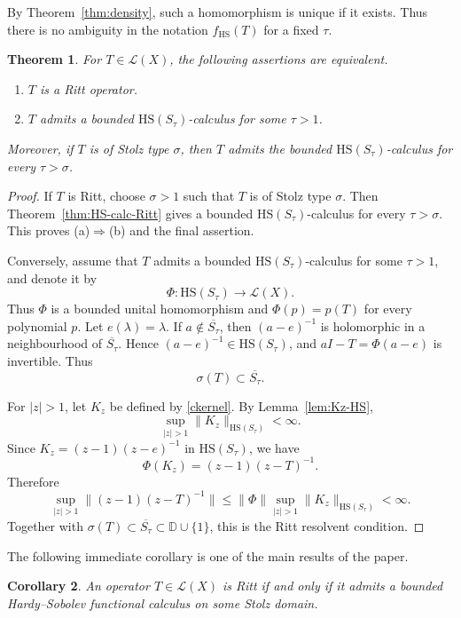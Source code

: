 \documentclass[11pt]{amsart}
\numberwithin{equation}{section}
\newtheorem{theorem}{Theorem}[section]
\newtheorem{corollary}[theorem]{Corollary}
\theoremstyle{definition}
\theoremstyle{plain}
\def\L{L}
\def\D{\mathbb{D}}
\newcommand{\HS}{\mathrm{HS}}
\renewcommand{\L}{\mathcal L}
\begin{document}
By Theorem~\ref{thm:density}, such a homomorphism is unique if it exists. Thus
there is no ambiguity in the notation \(f_{\HS}(T)\) for a fixed \(\tau\).

\begin{theorem}\label{thm:Ritt-iff-HS}
For \(T\in\L(X)\), the following assertions are equivalent.
\begin{enumerate}[label=\textnormal{(\alph*)}]
\item \(T\) is a Ritt operator.
\item \(T\) admits a bounded \(\HS(S_\tau)\)-calculus for some \(\tau>1\).
\end{enumerate}
Moreover, if \(T\) is of Stolz type \(\sigma\), then \(T\) admits the bounded \(\HS(S_\tau)\)-calculus for every \(\tau>\sigma\).
\end{theorem}



\begin{proof}
If \(T\) is Ritt, choose \(\sigma>1\) such that \(T\) is of Stolz type
\(\sigma\). Then Theorem~\ref{thm:HS-calc-Ritt} gives a bounded
\(\HS(S_\tau)\)-calculus for every \(\tau>\sigma\). This proves
\textup{(a)}\(\Rightarrow\)\textup{(b)} and the final assertion.

Conversely, assume that \(T\) admits a bounded \(\HS(S_\tau)\)-calculus for
some \(\tau>1\), and denote it by
\[
        \Phi:\HS(S_\tau)\to\L(X).
\]
Thus \(\Phi\) is a bounded unital homomorphism and \(\Phi(p)=p(T)\) for every
polynomial \(p\). Let \(e(\lambda)=\lambda\).
If \(a\notin\overline{S_\tau}\), then \((a-e)^{-1}\) is holomorphic in a
neighbourhood of \(\overline{S_\tau}\). Hence \((a-e)^{-1}\in \HS(S_\tau)\),
and \(aI-T=\Phi(a-e)\) is invertible.
Thus
\[
        \sigma(T)\subset\overline{S_\tau}.
\]

For \(|z|>1\), let
\(
 K_z
\) be defined by \eqref{ckernel}.
By Lemma~\ref{lem:Kz-HS},
\[
        \sup_{|z|>1}\|K_z\|_{\HS(S_\tau)}<\infty .
\]
Since \(K_z=(z-1)(z-e)^{-1}\) in \(\HS(S_\tau)\), we have
\[
        \Phi(K_z)=(z-1)(z-T)^{-1}.
\]
Therefore
\[
        \sup_{|z|>1}\|(z-1)(z-T)^{-1}\|
        \le
        \|\Phi\|\sup_{|z|>1}\|K_z\|_{\HS(S_\tau)}<\infty .
\]
Together with \(\sigma(T)\subset\overline{S_\tau}\subset\D\cup\{1\}\), this is
the Ritt resolvent condition.
\end{proof}





The following immediate corollary is one of the main results of the paper.
\begin{corollary}
An operator \(T\in\L(X)\) is Ritt if and only if it admits a bounded Hardy--Sobolev functional calculus on some Stolz domain.
\end{corollary}
\end{document}
